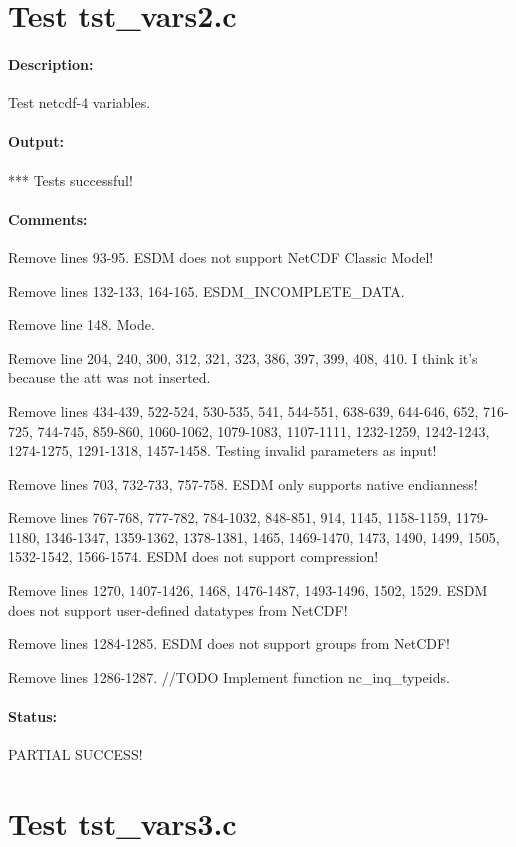 \section{Test tst\_vars2.c}

\paragraph{Description:} Test netcdf-4 variables.

\paragraph{Output:} *** Tests successful!

\paragraph{Comments:} Remove lines 93-95. ESDM does not support NetCDF Classic Model!

Remove lines 132-133, 164-165. ESDM\_INCOMPLETE\_DATA.

Remove line 148. Mode.

Remove line 204, 240, 300, 312, 321, 323, 386, 397, 399, 408, 410. I think it's because the att was not inserted.

Remove lines 434-439, 522-524, 530-535, 541, 544-551, 638-639, 644-646, 652, 716-725, 744-745, 859-860, 1060-1062, 1079-1083, 1107-1111, 1232-1259, 1242-1243, 1274-1275, 1291-1318, 1457-1458. Testing invalid parameters as input!

Remove lines 703, 732-733, 757-758. ESDM only supports native endianness!

Remove lines 767-768, 777-782, 784-1032, 848-851, 914, 1145, 1158-1159, 1179-1180, 1346-1347, 1359-1362, 1378-1381, 1465, 1469-1470, 1473, 1490, 1499, 1505, 1532-1542, 1566-1574. ESDM does not support compression!

Remove lines 1270, 1407-1426, 1468, 1476-1487, 1493-1496, 1502, 1529. ESDM does not support user-defined datatypes from NetCDF!

Remove lines 1284-1285. ESDM does not support groups from NetCDF!

Remove lines 1286-1287. //TODO Implement function nc\_inq\_typeids.

\paragraph{Status:} PARTIAL SUCCESS!

\section{Test tst\_vars3.c}

